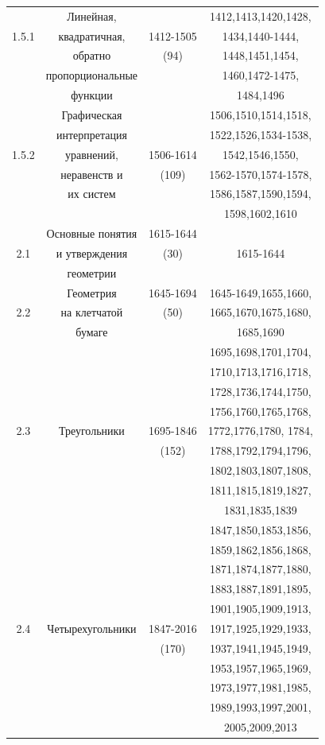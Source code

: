 \begin{table}[H]
\begin{center}
\begin{tabular}{|c|c|c|c|}
\hline
~ & Линейная, & ~ & 1412,1413,1420,1428,\\
1.5.1 & квадратичная, & 1412-1505 & 1434,1440-1444,\\
~ &  обратно & (94) & 1448,1451,1454,\\
~ & пропорциональные & ~ & 1460,1472-1475,\\
~ & функции & ~ & 1484,1496\\
\hline
~ & Графическая & ~ & 1506,1510,1514,1518,\\
~ & интерпретация & ~ & 1522,1526,1534-1538,\\
1.5.2 & уравнений, & 1506-1614 & 1542,1546,1550,\\
~ & неравенств и & (109) & 1562-1570,1574-1578,\\
~ & их систем & ~ & 1586,1587,1590,1594,\\
~ & ~ & ~ & 1598,1602,1610\\
\hline
~  & Основные понятия & 1615-1644 & ~\\
2.1 & и утверждения & (30) & 1615-1644\\
~ & геометрии & ~ & ~\\
\hline
~ & Геометрия & 1645-1694 & 1645-1649,1655,1660,\\
2.2  & на клетчатой & (50) & 1665,1670,1675,1680,\\
~ & бумаге & ~ & 1685,1690\\
\hline
~ & ~ & ~ & 1695,1698,1701,1704,\\
~ & ~ & ~ & 1710,1713,1716,1718,\\
~ & ~ & ~ & 1728,1736,1744,1750,\\
~ & ~ & ~ & 1756,1760,1765,1768,\\
2.3 & Треугольники & 1695-1846 & 1772,1776,1780, 1784,\\
~ & ~ & (152) & 1788,1792,1794,1796,\\
~ & ~ & ~ & 1802,1803,1807,1808,\\
~ & ~ & ~ & 1811,1815,1819,1827,\\
~ & ~ & ~ & 1831,1835,1839\\
\hline
~ & ~ & ~ & 1847,1850,1853,1856,\\
~ & ~ & ~ & 1859,1862,1856,1868,\\
~ & ~ & ~ & 1871,1874,1877,1880,\\
~ & ~ & ~ & 1883,1887,1891,1895,\\
~ & ~ & ~ & 1901,1905,1909,1913,\\
2.4 & Четырехугольники & 1847-2016 &1917,1925,1929,1933,\\
~ & ~ & (170) & 1937,1941,1945,1949,\\
~ & ~ & ~ & 1953,1957,1965,1969,\\
~ & ~ & ~ & 1973,1977,1981,1985,\\
~ & ~ & ~ & 1989,1993,1997,2001,\\
~ & ~ & ~ & 2005,2009,2013\\
\hline
\end{tabular}
\end{center}
\end{table}
